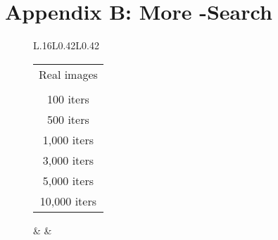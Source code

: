 \documentclass[runningheads]{llncs}
\begin{document}
    \vfill
    
    \clearpage
    
    \section{Appendix B: More -Search}
    
    \vfill
    
    \begin{figure}[!h]
        \begin{tabular}{L{.16\linewidth}L{0.42\linewidth}L{0.42\linewidth}}
            \begin{tabular}{c}
                \scriptsize Real images  \\ [0.9em]
                \scriptsize  \\ [0.9em]
                \scriptsize 100 iters \\ [0.9em]
                \scriptsize 500 iters \\ [0.9em]
                \scriptsize 1{,}000 iters \\ [0.9em]
                \scriptsize 3{,}000 iters \\ [0.9em]
                \scriptsize 5{,}000 iters \\ [0.9em]
                \scriptsize 10{,}000 iters
                \end{tabular} &
             &
        \end{tabular}
        

\end{figure}
\end{document}
